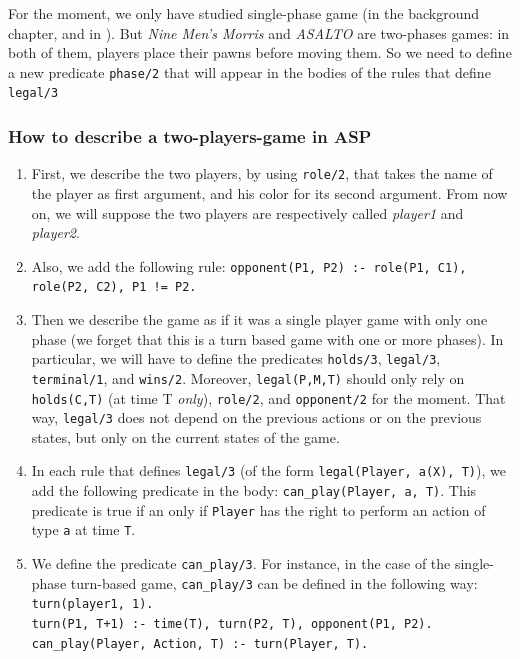 \documentclass[12pt,twoside]{report}
\begin{document}
\bigskip

For the moment, we only have studied single-phase game (in the background chapter, and in \cite{thielscher2009answer}). But \textit{Nine Men's Morris} and \textit{ASALTO} are two-phases games: in both of them, players place their pawns before moving them. So we need to define a new predicate \texttt{phase/2} that will appear in the bodies of the rules that define \texttt{legal/3}

\subsubsection{How to describe a two-players-game in ASP}

\begin{enumerate}

\item First, we describe the two players, by using \texttt{role/2}, that takes the name of the player as first argument, and his color for its second argument. From now on, we will suppose the two players are respectively called \textit{player1} and \textit{player2}.  

\item Also, we add the following rule: \newline
\texttt{opponent(P1, P2) :- role(P1, C1), role(P2, C2), P1 != P2.}

\item Then we describe the game as if it was a single player game with only one phase \citep{thielscher2009answer} (we forget that this is a turn based game with one or more phases). In particular, we will have to define the predicates \texttt{holds/3}, \texttt{legal/3}, \texttt{terminal/1}, and \texttt{wins/2}. Moreover,  \texttt{legal(P,M,T)} should only rely on \texttt{holds(C,T)} (at time T \textit{only}), \texttt{role/2}, and \texttt{opponent/2} for the moment. That way, \texttt{legal/3} does not depend on the previous actions or on the previous states, but only on the current states of the game.

\item In each rule that defines \texttt{legal/3} (of the form \texttt{legal(Player, a(X), T)}), we add the following predicate in the body: \texttt{can\_play(Player, a, T)}. This predicate is true if an only if \texttt{Player} has the right to perform an action of type \texttt{a} at time \texttt{T}. 

\item We define the predicate \texttt{can\_play/3}. For instance, in the case of the single-phase turn-based game, \texttt{can\_play/3} can be defined in the following way:\newline
\texttt{turn(player1, 1). }\\
\texttt{turn(P1, T+1) :- time(T), turn(P2, T), opponent(P1, P2).}\\
\texttt{can\_play(Player, Action, T) :- turn(Player, T).}



\end{enumerate}
\end{document}
